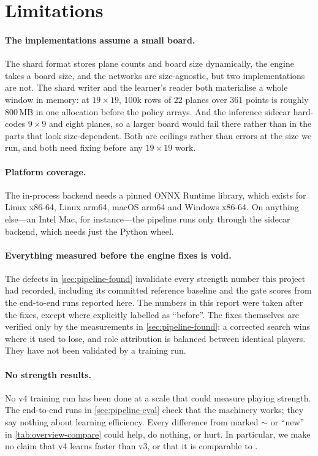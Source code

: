 \section{Limitations}\label{sec:limitations}

\paragraph{The implementations assume a small board.}
The shard format stores plane counts and board size dynamically, the engine takes a board
size, and the  networks are size-agnostic, but two implementations are not.
The shard writer and the learner's reader both materialise a whole window in memory: at
$19\times19$, 100k rows of 22 planes over 361 points is roughly 800\,MB in one allocation
before the policy arrays. And the inference sidecar hard-codes $9\times9$ and eight
planes, so a larger board would fail there rather than in the parts that look
size-dependent. Both are ceilings rather than errors at the size we run, and both need
fixing before any $19\times19$ work.

\paragraph{Platform coverage.}
The in-process backend needs a pinned ONNX Runtime library, which exists for Linux
x86-64, Linux arm64, macOS arm64 and Windows x86-64. On anything else---an Intel Mac, for
instance---the pipeline runs only through the sidecar backend, which needs just the Python
wheel.

\paragraph{Everything measured before the engine fixes is void.}
The defects in \cref{sec:pipeline-found} invalidate every strength number this project
had recorded, including its committed reference baseline and the gate scores from the
end-to-end runs reported here. The numbers in this report were taken after the fixes,
except where explicitly labelled as ``before''. The fixes themselves are verified only by
the measurements in \cref{sec:pipeline-found}: a corrected search wins where it used to
lose, and role attribution is balanced between identical players. They have not been
validated by a training run.

\paragraph{No strength results.}
No v4 training run has been done at a scale that could measure playing strength. The end-to-end runs in \cref{sec:pipeline-eval}
check that the machinery works; they say nothing about learning efficiency. Every
difference from \katago{} marked $\sim$ or ``new'' in \cref{tab:overview-compare} could
help, do nothing, or hurt. In particular, we make no claim that \gofer{} v4 learns faster
than \gofer{} v3, or that it is comparable to \katago{}.

